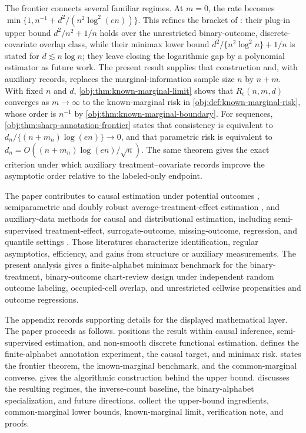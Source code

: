 The frontier connects several familiar regimes. At \(m=0\), the rate becomes \(\min\{1,n^{-1}+d^2/(n^2\log^2(en))\}\). This refines the bracket of \citet[Theorems 1--2 and the discussion following Theorem 2]{ZengBalakrishnanHanKennedy2024}: their plug-in upper bound \(d^2/n^2+1/n\) holds over the unrestricted binary-outcome, discrete-covariate overlap class, while their minimax lower bound \(d^2/\{n^2\log^2 n\}+1/n\) is stated for \(d\lesssim n\log n\); they leave closing the logarithmic gap by a polynomial estimator as future work. The present result supplies that construction and, with auxiliary records, replaces the marginal-information sample size \(n\) by \(n+m\). With fixed \(n\) and \(d\), \cref{obj:thm:known-marginal-limit} shows that \(R_\epsilon(n,m,d)\) converges as \(m\to\infty\) to the known-marginal risk in \cref{obj:def:known-marginal-risk}, whose order is \(n^{-1}\) by \cref{obj:thm:known-marginal-boundary}. For sequences, \cref{obj:thm:sharp-annotation-frontier} states that consistency is equivalent to \(d_n/\{(n+m_n)\log(en)\}\to0\), and that parametric risk is equivalent to \(d_n=O((n+m_n)\log(en)/\sqrt n)\). The same theorem gives the exact criterion under which auxiliary treatment--covariate records improve the asymptotic order relative to the labeled-only endpoint.

The paper contributes to causal estimation under potential outcomes \citep{Rubin1974,RosenbaumRubin1983,ImbensRubin2015}, semiparametric and doubly robust average-treatment-effect estimation \citep{RobinsRotnitzkyZhao1994,Hahn1998,HiranoImbensRidder2003,BangRobins2005,Farrell2015,AtheyImbensWager2018,ChernozhukovChetverikovDemirerDufloHansenNeweyRobins2018,Kennedy2016}, and auxiliary-data methods for causal and distributional estimation, including semi-supervised treatment-effect, surrogate-outcome, missing-outcome, regression, and quantile settings \citep{ChengAnanthakrishnanCai2021,ChakraborttyLuCaiLi2019,ChakraborttyDai2024,ChakraborttyDaiCarroll2022,KallusMao2025,AnniwaerZhang2025,XuWittenShojaie2025}. Those literatures characterize identification, regular asymptotics, efficiency, and gains from structure or auxiliary measurements. The present analysis gives a finite-alphabet minimax benchmark for the binary-treatment, binary-outcome chart-review design under independent random outcome labeling, occupied-cell overlap, and unrestricted cellwise propensities and outcome regressions.

The appendix records supporting details for the displayed mathematical layer. The paper proceeds as follows.  positions the result within causal inference, semi-supervised estimation, and non-smooth discrete functional estimation.  defines the finite-alphabet annotation experiment, the causal target, and minimax risk.  states the frontier theorem, the known-marginal benchmark, and the common-marginal converse.  gives the algorithmic construction behind the upper bound.  discusses the resulting regimes, the inverse-count baseline, the binary-alphabet specialization, and future directions.  collect the upper-bound ingredients, common-marginal lower bounds, known-marginal limit, verification note, and proofs.
